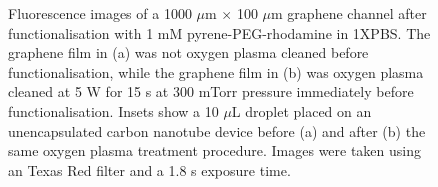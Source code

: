 \documentclass[
  a4paper,
]{scrbook}
\begin{document}
\begin{figure}
\begin{minipage}[t]{0.47\linewidth}
{{}

}

\subcaption{\label{fig-attachment-post-plasma}}
\end{minipage}%

\caption{\label{fig-hydrophobicity}Fluorescence images of a 1000
\(\mu\)m \(\times\) 100 \(\mu\)m graphene channel after
functionalisation with 1 mM pyrene-PEG-rhodamine in 1XPBS. The graphene
film in (a) was not oxygen plasma cleaned before functionalisation,
while the graphene film in (b) was oxygen plasma cleaned at 5 W for 15 s
at 300 mTorr pressure immediately before functionalisation. Insets show
a 10 \(\mu\)L droplet placed on an unencapsulated carbon nanotube device
before (a) and after (b) the same oxygen plasma treatment procedure.
Images were taken using an Texas Red filter and a 1.8 s exposure time.}

\end{figure}
\end{document}
